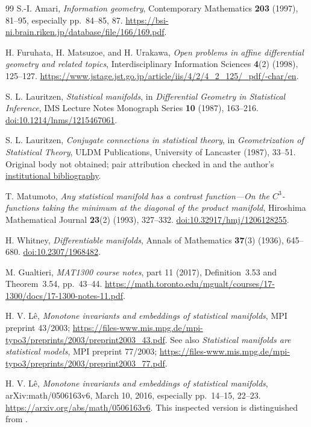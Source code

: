 \documentclass[10pt,letterpaper]{article}
\begin{document}
\begin{thebibliography}{99}\small
{}
S.-I. Amari, \emph{Information geometry}, Contemporary Mathematics
\textbf{203} (1997), 81--95, especially pp.~84--85, 87.
\url{https://bsi-ni.brain.riken.jp/database/file/166/169.pdf}.

H. Furuhata, H. Matsuzoe, and H. Urakawa,
\emph{Open problems in affine differential geometry and related topics},
Interdisciplinary Information Sciences \textbf{4}(2) (1998), 125--127.
\url{https://www.jstage.jst.go.jp/article/iis/4/2/4_2_125/_pdf/-char/en}.

S. L. Lauritzen, \emph{Statistical manifolds}, in
\emph{Differential Geometry in Statistical Inference}, IMS Lecture Notes
Monograph Series \textbf{10} (1987), 163--216.
\href{https://doi.org/10.1214/lnms/1215467061}{doi:10.1214/lnms/1215467061}.

S. L. Lauritzen, \emph{Conjugate connections in statistical theory},
in \emph{Geometrization of Statistical Theory}, ULDM Publications,
University of Lancaster (1987), 33--51. Original body not obtained;
pair attribution checked in \cite[\S2.4]{Marugame} and the author's
\href{https://web.math.ku.dk/~lauritzen/publications.html}{institutional bibliography}.

T. Matumoto, \emph{Any statistical manifold has a contrast function---On
the $C^3$-functions taking the minimum at the diagonal of the product
manifold}, Hiroshima Mathematical Journal \textbf{23}(2) (1993), 327--332.
\href{https://doi.org/10.32917/hmj/1206128255}{doi:10.32917/hmj/1206128255}.

H. Whitney, \emph{Differentiable manifolds}, Annals of Mathematics
\textbf{37}(3) (1936), 645--680.
\href{https://doi.org/10.2307/1968482}{doi:10.2307/1968482}.

M. Gualtieri, \emph{MAT1300 course notes}, part 11 (2017),
Definition~3.53 and Theorem~3.54, pp.~43--44.
\url{https://math.toronto.edu/mgualt/courses/17-1300/docs/17-1300-notes-11.pdf}.

H. V. L\^e, \emph{Monotone invariants and embeddings of statistical
manifolds}, MPI preprint 43/2003;
\url{https://files-www.mis.mpg.de/mpi-typo3/preprints/2003/preprint2003_43.pdf}.
See also \emph{Statistical manifolds are statistical models}, MPI preprint
77/2003;
\url{https://files-www.mis.mpg.de/mpi-typo3/preprints/2003/preprint2003_77.pdf}.

H. V. L\^e, \emph{Monotone invariants and embeddings of statistical
manifolds}, arXiv:math/0506163v6, March 10, 2016, especially pp.~14--15,
22--23. \url{https://arxiv.org/abs/math/0506163v6}.
This inspected version is distinguished from \cite{Le2007}.


\end{thebibliography}
\end{document}
